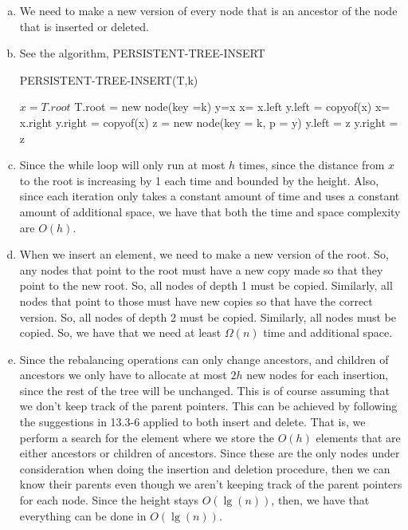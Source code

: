 \documentclass{article}
\begin{document}
\begin{enumerate}[a.]
\item
We need to make a new version of every node that is an ancestor of the node that is inserted or deleted.

\item
See the algorithm, PERSISTENT-TREE-INSERT

\begin{algorithm}
\caption{PERSISTENT-TREE-INSERT(T,k)}
\begin{algorithmic}
\State $x = T.root$
\State T.root = new node(key =k)
\EndIf
{}
\State y=x
\State x=  x.left
\State y.left = copyof(x)
\Else
\State x= x.right
\State y.right = copyof(x)
\EndIf
\EndWhile
\State z = new node(key = k, p = y)
\State y.left = z
\Else
\State y.right = z
\EndIf
\end{algorithmic}
\end{algorithm}

\item
Since the while loop will only run at most $h$ times, since the distance from $x$ to the root is increasing by 1 each time and bounded by the height. Also, since each iteration only takes a constant amount of time and uses a constant amount of additional space, we have that both the time and space complexity are $O(h)$.


\item
When we insert an element, we need to make a new version of the root. So, any nodes that point to the root must have a new copy made so that they point to the new root. So, all nodes of depth 1 must be copied. Similarly, all nodes that point to those must have new copies so that have the correct version. So, all nodes of depth 2 must be copied. Similarly, all nodes must be copied. So, we have that we need at least $\Omega(n)$ time and additional space.

\item
Since the rebalancing operations can only change ancestors, and children of ancestors we only have to allocate at most $2h$ new nodes for each insertion, since the rest of the tree will be unchanged. This is of course assuming that we don't keep track of the parent pointers. This can be achieved by following the suggestions in 13.3-6 applied to both insert and delete. That is, we perform a search for the element where we store the $O(h)$ elements that are either ancestors or children of ancestors. Since these are the only nodes under consideration when doing the insertion and deletion procedure, then we can know their parents even though we aren't keeping track of the parent pointers for each node. Since the height stays $O(\lg(n))$, then, we have that everything can be done in $O(\lg(n))$.


\end{enumerate}
\end{document}

